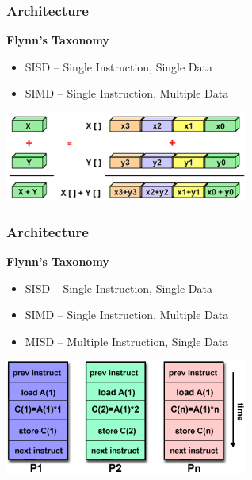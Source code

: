 \documentclass[t]{beamer}
\begin{document}
\begin{frame}
\frametitle{Architecture}
\textbf{Flynn's Taxonomy}
\begin{itemize}
\item SISD -- Single Instruction, Single Data

\item SIMD -- Single Instruction, Multiple Data
\end{itemize}

\begin{center}
\includegraphics[width=0.6\textwidth]{img/simd.png} 
\end{center}
\end{frame}
\begin{frame}
\frametitle{Architecture}
\textbf{Flynn's Taxonomy}
\begin{itemize}
\item SISD -- Single Instruction, Single Data

\item SIMD -- Single Instruction, Multiple Data

\item MISD -- Multiple Instruction, Single Data 
\end{itemize}

\begin{center}
\includegraphics[width=0.6\textwidth]{img/misd.png} 
\end{center}
\end{frame}
\end{document}
